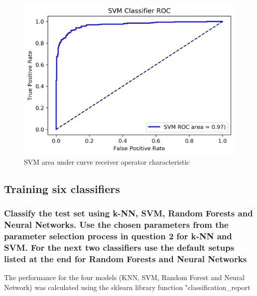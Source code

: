 \begin{figure}[!ht]
 \centering
\includegraphics[width=6.1in]{assignment2/2-2-b-svm.png}
\caption{\label{fig:svmtuning} SVM area under curve receiver operator characteristic}
\end{figure}


\subsection{Training six classifiers}

\subsubsection{Classify the test set using k-NN, SVM, Random Forests and Neural Networks. Use the chosen parameters from the parameter selection process in question 2 for k-NN and SVM. For the next two classifiers use the default setups listed at the end for Random Forests and Neural Networks}


The performance for the four models (KNN, SVM, Random Forest and Neural Network) was calculated using the sklearn library function "classification\_report

